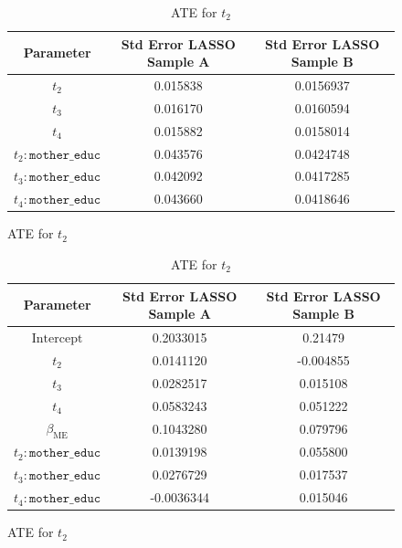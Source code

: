 \documentclass{article}
\begin{document}
\begin{figure}[H]
  \begin{table}[H]
  \centering
  \begin{tabular}{|c|cc|}
    \hline
    Parameter                   & Std Error LASSO Sample A & Std Error LASSO Sample B \\
    \hline
    $t_2$                       & 0.015838        & 0.0156937 \\
    $t_3$                       & 0.016170        & 0.0160594 \\
    $t_4$                       & 0.015882        & 0.0158014 \\
    $t_2:\texttt{mother\_educ}$ & 0.043576        & 0.0424748 \\
    $t_3:\texttt{mother\_educ}$ & 0.042092        & 0.0417285 \\
    $t_4:\texttt{mother\_educ}$ & 0.043660        & 0.0418646 \\
    \hline
  \end{tabular}
  \caption{ATE for $t_2$}
\end{table}
\end{figure}

\begin{figure}[H]
  \begin{table}[H]
  \centering
  \begin{tabular}{|c|cc|}
    \hline
    Parameter                   & Std Error LASSO Sample A & Std Error LASSO Sample B \\
    \hline
    $\text{Intercept}$          & 0.2033015  &  0.21479 \\
    $t_2$                       & 0.0141120  &  -0.004855 \\
    $t_3$                       & 0.0282517  &  0.015108 \\
    $t_4$                       & 0.0583243  &  0.051222 \\
    $\beta_{\text{ME}}$         & 0.1043280  &  0.079796 \\
    $t_2:\texttt{mother\_educ}$ & 0.0139198  &  0.055800 \\
    $t_3:\texttt{mother\_educ}$ & 0.0276729  &  0.017537 \\
    $t_4:\texttt{mother\_educ}$ & -0.0036344 &  0.015046 \\
    \hline
  \end{tabular}
  \caption{ATE for $t_2$}
\end{table}
\end{figure}
\end{document}
